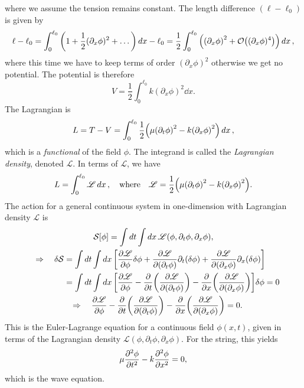 \documentclass{article}
\begin{document}
where we assume the tension remains constant. The length difference $ (\ell - \ell_{0}) $ is given by
\begin{equation}
	\ell - \ell_{0}= \int_{0}^{\ell_{0}} \qty(1 + \frac{1}{2} (\partial_{x}\phi)^{2} + \dots) \dd{x} - \ell_{0} = \frac{1}{2} \int_{0}^{\ell_{0}} \qty(\qty(\partial_{x}\phi)^{2} + \order{(\partial_{x}\phi)^{4}})\dd{x},
\end{equation}
where this time we have to keep terms of order $ (\partial_{x}\phi)^{2} $ otherwise we get no potential. The potential is therefore
\begin{equation}
	V = \frac{1}{2} \int_{0}^{\ell_{0}} k (\partial_{x}\phi)^{2} \dd{x}.
\end{equation}
The Lagrangian is
\begin{equation}
	L = T - V = \int_{0}^{\ell_{0}} \frac{1}{2} \qty(\mu \qty(\partial_{t}\phi)^{2} - k \qty(\partial_{x} \phi)^{2}) \dd{x},
\end{equation}
which is a \textit{functional} of the field $ \phi $. The integrand is called the \textit{Lagrangian density}, denoted $ \mathscr{L} $. In terms of $ \mathscr{L} $, we have
\begin{equation}
	L = \int_{0}^{\ell_{0}} \mathscr{L} \dd{x}, \qq{where} \mathscr{L} = \frac{1}{2} \qty(\mu \qty(\partial_{t}\phi)^{2} - k \qty(\partial_{x}\phi)^{2}).
\end{equation}
The action for a general continuous system in one-dimension with Lagrangian density $ \mathscr{L}$ is
\begin{gather}
	\begin{split}
		\mathcal{S}[\phi] = \int \dd{t} \int \dd{x} \mathscr{L}(\phi,\partial_{t}\phi,\partial_{x}\phi),
	\end{split} \\
	\begin{split}
		\quad \Rightarrow \quad \delta \mathcal{S} &= \int \dd{t} \int\dd{x} \qty[\pdv{\mathscr{L}}{\phi} \delta \phi + \pdv{\mathscr{L}}{(\partial_{t}\phi)} \partial_{t} (\delta \phi) + \pdv{\mathscr{L}}{(\partial_{x}\phi)} \partial_{x}(\delta \phi)]\\
		&= \int \dd{t} \int \dd{x} \qty[\pdv{\mathscr{L}}{\phi} - \pdv{t}(\pdv{\mathscr{L}}{(\partial_{t}\phi)}) - \pdv{x}(\pdv{\mathscr{L}}{(\partial_{x}\phi)})] \delta \phi = 0
	\end{split} \\
	\begin{split}
		\quad \Rightarrow \quad \pdv{\mathscr{L}}{\phi} - \pdv{t}(\pdv{\mathscr{L}}{(\partial_{t}\phi)}) - \pdv{x}(\pdv{\mathscr{L}}{(\partial_{x}\phi)}) = 0.
	\end{split}
\end{gather}
This is the Euler-Lagrange equation for a continuous field $ \phi(x,t) $, given in terms of the Lagrangian density $ \mathscr{L}(\phi,\partial_{t}\phi,\partial_{x}\phi) $. For the string, this yields
\begin{equation}
	\mu \pdv[2]{\phi}{t} - k \pdv[2]{\phi}{x} = 0,
\end{equation}
which is the wave equation.
\end{document}

